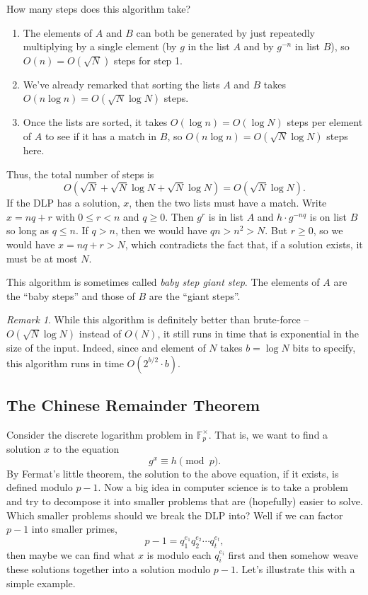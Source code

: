 \documentclass[12pt]{article}
\theoremstyle{plain}
\theoremstyle{definition}
\theoremstyle{remark}
\newtheorem{remark}[theorem]{Remark}
\newcommand{\F}{\mathbb{F}}
\begin{document}
How many steps does this algorithm take?
\begin{enumerate}
\item The elements of $A$ and $B$ can both be generated by just repeatedly multiplying by a single element (by $g$ in the list $A$ and by $g^{-n}$ in list $B$), so $O(n) = O(\sqrt{N})$ steps for step 1.

\item We've already remarked that sorting the lists $A$ and $B$ takes $O(n\log n) = O(\sqrt{N}\log N)$ steps.

\item Once the lists are sorted, it takes $O(\log n) = O(\log N)$ steps per element of $A$ to see if it has a match in $B$, so $O(n\log n) = O(\sqrt{N}\log N)$ steps here.
\end{enumerate}
Thus, the total number of steps is
\[
    O(\sqrt{N} + \sqrt{N}\log N + \sqrt{N}\log N) = O(\sqrt{N}\log N).
\]
If the DLP has a solution, $x$, then the two lists must have a match.
Write $x = nq + r$ with $0\leq r < n$ and $q \geq 0$.
Then $g^r$ is in list $A$ and $h\cdot g^{-nq}$ is on list $B$ so long as $q\leq n$.
If $q > n$, then we would have $qn > n^2 > N$.
But $r \geq 0$, so we would have $x = nq + r > N$, which contradicts the fact that, if a solution exists, it must be at most $N$.

This algorithm is sometimes called \emph{baby step giant step}. The elements of $A$ are the ``baby steps'' and those of $B$ are the ``giant steps''.

\begin{remark}
    While this algorithm is definitely better than brute-force -- $O(\sqrt{N}\log N)$ instead of $O(N)$, it still runs in time that is exponential in the size of the input.
    Indeed, since and element of $N$ takes $b = \log N$ bits to specify, this algorithm runs in time $O(2^{b/2}\cdot b)$.
\end{remark}










\subsection{The Chinese Remainder Theorem}
Consider the discrete logarithm problem in $\F_p^\times$.
That is, we want to find a solution $x$ to the equation
\[
    g^x \equiv h\pmod p.
\]
By Fermat's little theorem, the solution to the above equation, if it exists, is defined modulo $p-1$.
Now a big idea in computer science is to take a problem and try to decompose it into smaller problems that are (hopefully) easier to solve.
Which smaller problems should we break the DLP into?
Well if we can factor $p-1$ into smaller primes,
\[
    p-1 = q_1^{e_1}q_2^{e_2}\cdots q_t^{e_t},
\]
then maybe we can find what $x$ is modulo each $q_i^{e_i}$ first and then somehow weave these solutions together into a solution modulo $p-1$.
Let's illustrate this with a simple example.
\end{document}

